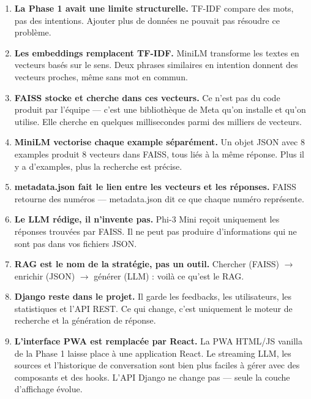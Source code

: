 \documentclass[11pt,a4paper]{article}
\begin{document}
\begin{important}
\begin{enumerate}
    \item \textbf{La Phase 1 avait une limite structurelle.}
    TF-IDF compare des mots, pas des intentions. Ajouter plus
    de données ne pouvait pas résoudre ce problème.

    \item \textbf{Les embeddings remplacent TF-IDF.}
    MiniLM transforme les textes en vecteurs basés sur le sens.
    Deux phrases similaires en intention donnent des vecteurs
    proches, même sans mot en commun.

    \item \textbf{FAISS stocke et cherche dans ces vecteurs.}
    Ce n'est pas du code produit par l'équipe --- c'est une
    bibliothèque de Meta qu'on installe et qu'on utilise.
    Elle cherche en quelques millisecondes parmi des milliers
    de vecteurs.

    \item \textbf{MiniLM vectorise chaque example séparément.}
    Un objet JSON avec 8 examples produit 8 vecteurs dans FAISS,
    tous liés à la même réponse. Plus il y a d'examples,
    plus la recherche est précise.

    \item \textbf{metadata.json fait le lien entre les vecteurs
    et les réponses.} FAISS retourne des numéros --- metadata.json
    dit ce que chaque numéro représente.

    \item \textbf{Le LLM rédige, il n'invente pas.}
    Phi-3 Mini reçoit uniquement les réponses trouvées par FAISS.
    Il ne peut pas produire d'informations qui ne sont pas
    dans vos fichiers JSON.

    \item \textbf{RAG est le nom de la stratégie, pas un outil.}
    Chercher (FAISS) $\rightarrow$ enrichir (JSON)
    $\rightarrow$ générer (LLM) : voilà ce qu'est le RAG.

    \item \textbf{Django reste dans le projet.}
    Il garde les feedbacks, les utilisateurs, les statistiques
    et l'API REST. Ce qui change, c'est uniquement le moteur
    de recherche et la génération de réponse.

    \item \textbf{L'interface PWA est remplacée par React.}
    La PWA HTML/JS vanilla de la Phase 1 laisse place à une
    application React. Le streaming LLM, les sources et
    l'historique de conversation sont bien plus faciles à
    gérer avec des composants et des hooks. L'API Django
    ne change pas --- seule la couche d'affichage évolue.


\end{enumerate}
\end{important}
\end{document}
